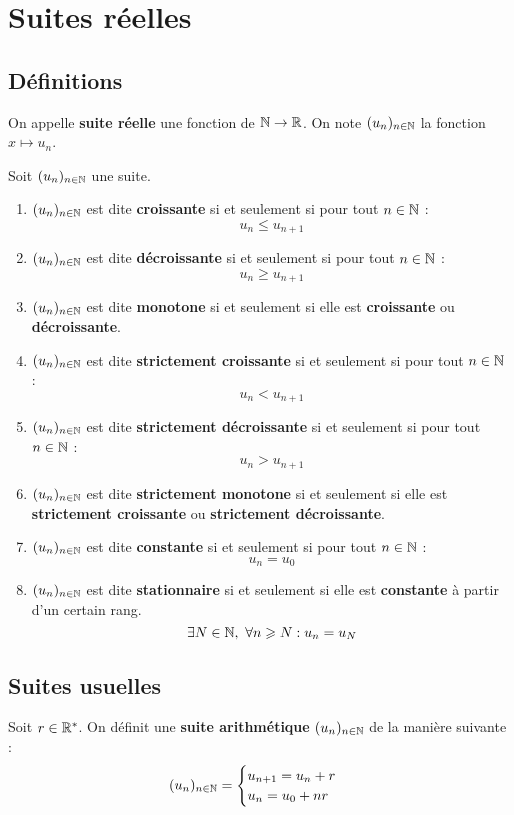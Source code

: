 \chapter{Suites réelles}
\def\arraystretch{1}

\section{Définitions}

\begin{definition}
    On appelle \textbf{suite réelle} une fonction de $\mathbb{N} \to \mathbb{R}$. 
    On note $(u_n)_{n \in \mathbb{N}}$ la fonction $x \mapsto u_n$.
\end{definition}

\begin{definition}
	Soit $(u_n)_{n \in \mathbb{N}}$ une suite.
	\begin{enumerate}
		\item $(u_n)_{n \in \mathbb{N}}$ est dite \textbf{croissante} si et seulement si pour tout $n \in \mathbb{N}$ :
		\[ u_n \leq u_{n+1} \]
		\item $(u_n)_{n \in \mathbb{N}}$ est dite \textbf{décroissante} si et seulement si pour tout $n \in \mathbb{N}$ :
		\[ u_n \geq u_{n+1} \]
		\item $(u_n)_{n \in \mathbb{N}}$ est dite \textbf{monotone} si et seulement si elle est \textbf{croissante} ou \textbf{décroissante}.
		\item $(u_n)_{n \in \mathbb{N}}$ est dite \textbf{strictement croissante} si et seulement si pour tout $n \in \mathbb{N}$ :
		\[ u_n < u_{n+1} \]
		\item $(u_n)_{n \in \mathbb{N}}$ est dite \textbf{strictement décroissante} si et seulement si pour tout $n \in \mathbb{N}$ :
		\[ u_n > u_{n+1} \]
		\item $(u_n)_{n \in \mathbb{N}}$ est dite \textbf{strictement monotone} si et seulement si elle est \textbf{strictement croissante} ou \textbf{strictement décroissante}.
		\item $(u_n)_{n \in \mathbb{N}}$ est dite \textbf{constante} si et seulement si pour tout $n \in \mathbb{N}$ :
		\[ u_n = u_0 \]
		\item $(u_n)_{n \in \mathbb{N}}$ est dite \textbf{stationnaire} si et seulement si elle est \textbf{constante} à partir d'un certain rang. 
		\[ \exists N \in \mathbb{N},\ \forall n \geqslant N : u_n = u_N \]
	\end{enumerate}
\end{definition}

\section{Suites usuelles}
\begin{definition}
    Soit $r \in \mathbb{R}^*$.
    On définit une \textbf{suite arithmétique} $(u_n)_{n \in \mathbb{N}}$ de la manière suivante :
    \begin{align*}
        (u_n)_{n \in \mathbb{N}} =
        \begin{cases}
            u_{n+1} = u_n + r \\ 
            u_n = u_0 + nr
        \end{cases}
    \end{align*}
\end{definition}

